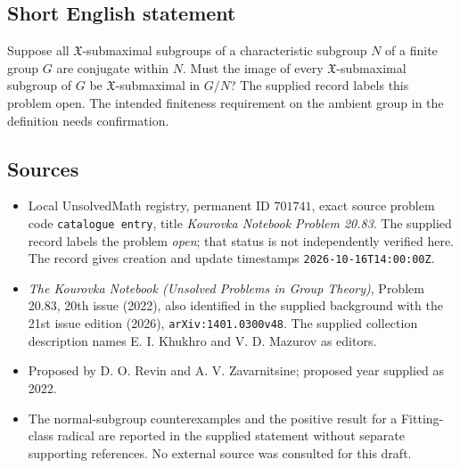 \documentclass[11pt]{article}
\begin{document}
\subsection{Short English statement}
Suppose all \(\mathfrak{X}\)-submaximal subgroups of a characteristic subgroup \(N\) of a finite group \(G\) are conjugate within \(N\). Must the image of every \(\mathfrak{X}\)-submaximal subgroup of \(G\) be \(\mathfrak{X}\)-submaximal in \(G/N\)? The supplied record labels this problem open. The intended finiteness requirement on the ambient group in the definition needs confirmation.
\subsection{Sources}
\begin{itemize}
\item Local UnsolvedMath registry, permanent ID \(701741\), exact source problem code \texttt{catalogue entry}, title \emph{Kourovka Notebook Problem 20.83}. The supplied record labels the problem \emph{open}; that status is not independently verified here. The record gives creation and update timestamps \texttt{2026-10-16T14:00:00Z}.
\item \emph{The Kourovka Notebook (Unsolved Problems in Group Theory)}, Problem 20.83, 20th issue (2022), also identified in the supplied background with the 21st issue edition (2026), \texttt{arXiv:1401.0300v48}. The supplied collection description names E. I. Khukhro and V. D. Mazurov as editors.
\item Proposed by D. O. Revin and A. V. Zavarnitsine; proposed year supplied as 2022.
\item The normal-subgroup counterexamples and the positive result for a Fitting-class radical are reported in the supplied statement without separate supporting references. No external source was consulted for this draft.
\end{itemize}
\end{document}
